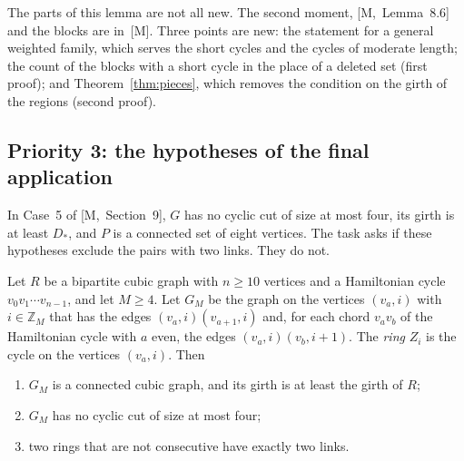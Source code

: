 \documentclass[11pt]{article}
\newcommand{\M}[1]{[M,~#1]}
\begin{document}
The parts of this lemma are not all new. The second moment, \M{Lemma~8.6} and the blocks are
in~[M]. Three points are new: the statement for a general weighted family, which serves the short
cycles and the cycles of moderate length; the count of the blocks with a short cycle in the place
of a deleted set (first proof); and Theorem~\ref{thm:pieces}, which removes the condition on the
girth of the regions (second proof).

\subsection{Priority 3: the hypotheses of the final application}\label{sec:p3}

In Case~5 of \M{Section~9}, $G$ has no cyclic cut of size at most four, its girth is at least
$D_*$, and $P$ is a connected set of eight vertices. The task asks if these hypotheses exclude the
pairs with two links. They do not.

\begin{lemma}[Necklaces]\label{lem:necklace}
Let $R$ be a bipartite cubic graph with $n\ge10$ vertices and a Hamiltonian cycle
$v_0v_1\cdots v_{n-1}$, and let $M\ge4$. Let $G_M$ be the graph on the vertices $(v_a,i)$ with
$i\in\mathbb Z_M$ that has the edges $(v_a,i)(v_{a+1},i)$ and, for each chord $v_av_b$ of the
Hamiltonian cycle with $a$ even, the edges $(v_a,i)(v_b,i+1)$. The \emph{ring} $Z_i$ is the cycle
on the vertices $(v_a,i)$. Then
\begin{enumerate}
\item[\textup{(i)}] $G_M$ is a connected cubic graph, and its girth is at least the girth of $R$;
\item[\textup{(ii)}] $G_M$ has no cyclic cut of size at most four;
\item[\textup{(iii)}] two rings that are not consecutive have exactly two links.
\end{enumerate}
\end{lemma}
\end{document}
